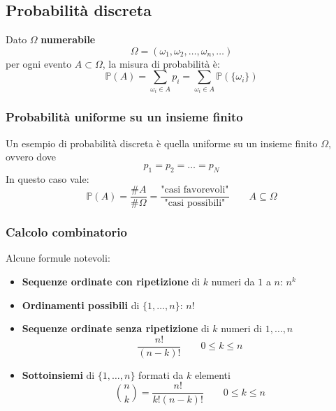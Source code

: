 \subsection{Probabilità discreta}
\begin{definition}
	Dato $\Omega$ \textbf{numerabile}
	\begin{equation*}
		\Omega = (\omega_1, \omega_2, \ldots, \omega_n, \ldots)
	\end{equation*}
	per ogni evento $A \subset \Omega$, la misura di probabilità è:
	\begin{equation}
		\mathbb{P}(A) = \sum_{\omega_i \in A}p_i = \sum_{\omega_i \in A} \mathbb{P}(\{\omega_i\})
	\end{equation}
\end{definition}

\subsubsection{Probabilità uniforme su un insieme finito}
Un esempio di probabilità discreta è quella uniforme su un insieme finito $\Omega$, ovvero dove
\begin{equation*}
	p_1 = p_2 = \ldots = p_N
\end{equation*}
In questo caso vale:
\begin{equation}
	\mathbb{P}(A) = \frac{\# A}{\# \Omega} = \frac{\text{"casi favorevoli"}}{\text{"casi possibili"}} \quad\quad A \subseteq \Omega
\end{equation}

\subsubsection{Calcolo combinatorio}
Alcune formule notevoli:
\begin{itemize}
	\item \textbf{Sequenze ordinate con ripetizione} di $k$ numeri da $1$ a $n$: $n^k$
	\item  \textbf{Ordinamenti possibili} di $\{1, \ldots, n\}$: $n!$
	\item \textbf{Sequenze ordinate senza ripetizione} di $k$ numeri di $1, \ldots, n$
	\begin{equation*}
		\frac{n!}{(n-k)!} \quad\quad 0 \leq k \leq n
	\end{equation*}
	\item \textbf{Sottoinsiemi} di $\{1, \ldots, n\}$ formati da $k$ elementi
	\begin{equation*}
		\binom{n}{k} = \frac{n!}{k!(n-k)!} \quad\quad 0 \leq k \leq n
	\end{equation*}
\end{itemize}
